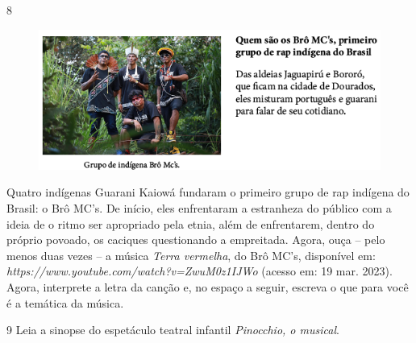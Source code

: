 
\pagebreak
\num{8}

\begin{figure}[htpb!]
\includegraphics[width=\textwidth]{../ilustracoes/ART5/SAEB_5ANO_ART_FIGURA6.png}
\end{figure}

Quatro indígenas Guarani Kaiowá fundaram o primeiro grupo
de rap indígena do Brasil: o Brô MC's. De início, eles enfrentaram
a estranheza do público com a ideia de o ritmo ser apropriado pela
etnia, além de enfrentarem, dentro do próprio povoado, os caciques
questionando a empreitada. Agora, ouça – pelo menos duas vezes –
a música \textit{Terra vermelha}, do Brô MC's, disponível em: \emph{https://www.youtube.com/watch?v=ZwuM0z1IJWo} (acesso em: 19 mar. 2023).
Agora, interprete a letra da canção e, no espaço a seguir, escreva o
que para você é a temática da música.



\pagebreak
\num{9} Leia a sinopse do espetáculo teatral infantil \emph{Pinocchio, o musical}.

